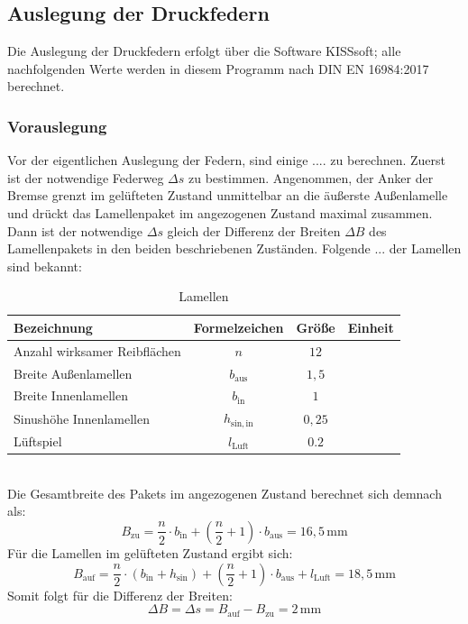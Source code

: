 \subsection{Auslegung der Druckfedern}
Die Auslegung der Druckfedern erfolgt über die Software KISSsoft; alle nachfolgenden Werte werden in diesem Programm nach DIN EN 16984:2017 berechnet. 
\newline
\subsubsection{Vorauslegung}
Vor der eigentlichen Auslegung der Federn, sind einige .... zu berechnen. 
Zuerst ist der notwendige Federweg $\Delta s$ zu bestimmen. Angenommen, der Anker der Bremse grenzt im gelüfteten Zustand unmittelbar an die äußerste Außenlamelle und drückt das Lamellenpaket im angezogenen Zustand maximal zusammen. Dann ist der notwendige $\Delta s$ gleich der Differenz der Breiten $\Delta B$ des Lamellenpakets in den beiden beschriebenen Zuständen. Folgende ... der Lamellen sind bekannt:
\begin{table}[H]
    \centering
    \caption{Lamellen}
    \begin{tabular}{p{8cm}ccc}
        \toprule
         Bezeichnung&  Formelzeichen& Größe& Einheit\\
         \midrule
         Anzahl wirksamer Reibflächen& $n$& $12$& \\
         Breite Außenlamellen& $b_\mathrm{aus}$& $1,5$& \\
         Breite Innenlamellen& $b_\mathrm{in}$& $1$& \\
         Sinushöhe Innenlamellen& $h_\mathrm{sin,in}$& $0,25$& \\
         Lüftspiel& $l_\mathrm{Luft}$& $0.2$& \\
         \bottomrule
    \end{tabular}
    \label{Lamellen}
\end{table}\\
\noindent
Die Gesamtbreite des Pakets im angezogenen Zustand berechnet sich demnach als:
\begin{equation}
   B_\mathrm{zu} = \frac{n}{2} \cdot b_\mathrm{in} + \left(\frac{n}{2} + 1\right) \cdot b_\mathrm{aus} = 16,5\,\mathrm{mm}
\end{equation}
Für die Lamellen im gelüfteten Zustand ergibt sich:
\begin{equation}
    B_\mathrm{auf} = \frac{n}{2} \cdot (b_\mathrm{in} + h_\mathrm{sin}) + \left(\frac{n}{2} + 1\right) \cdot b_\mathrm{aus} + l_\mathrm{Luft} = 18,5\,\mathrm{mm}
\end{equation}
Somit folgt für die Differenz der Breiten:
\begin{equation}
    \Delta B = \Delta s = B_\mathrm{auf} - B_\mathrm{zu} = 2\,\mathrm{mm}
\end{equation}


